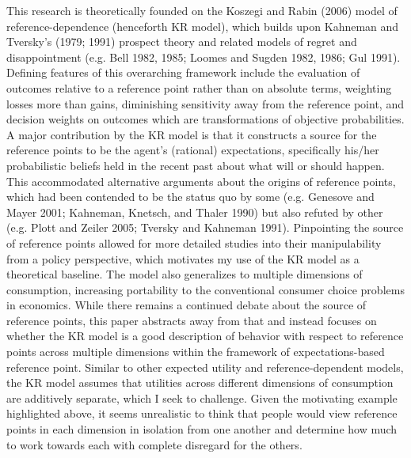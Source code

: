 \documentclass[
  12,
  letterpaper,
  DIV=11,
  numbers=noendperiod]{scrartcl}
\begin{document}
This research is theoretically founded on the Koszegi and Rabin (2006)
model of reference-dependence (henceforth KR model), which builds upon
Kahneman and Tversky's (1979; 1991) prospect theory and related models
of regret and disappointment (e.g. Bell 1982, 1985; Loomes and Sugden
1982, 1986; Gul 1991). Defining features of this overarching framework
include the evaluation of outcomes relative to a reference point rather
than on absolute terms, weighting losses more than gains, diminishing
sensitivity away from the reference point, and decision weights on
outcomes which are transformations of objective probabilities. A major
contribution by the KR model is that it constructs a source for the
reference points to be the agent's (rational) expectations, specifically
his/her probabilistic beliefs held in the recent past about what will or
should happen. This accommodated alternative arguments about the origins
of reference points, which had been contended to be the status quo by
some (e.g. Genesove and Mayer 2001; Kahneman, Knetsch, and Thaler 1990)
but also refuted by other (e.g. Plott and Zeiler 2005; Tversky and
Kahneman 1991). Pinpointing the source of reference points allowed for
more detailed studies into their manipulability from a policy
perspective, which motivates my use of the KR model as a theoretical
baseline. The model also generalizes to multiple dimensions of
consumption, increasing portability to the conventional consumer choice
problems in economics. While there remains a continued debate about the
source of reference points, this paper abstracts away from that and
instead focuses on whether the KR model is a good description of
behavior with respect to reference points across multiple dimensions
within the framework of expectations-based reference point. Similar to
other expected utility and reference-dependent models, the KR model
assumes that utilities across different dimensions of consumption are
additively separate, which I seek to challenge. Given the motivating
example highlighted above, it seems unrealistic to think that people
would view reference points in each dimension in isolation from one
another and determine how much to work towards each with complete
disregard for the others.
\end{document}

